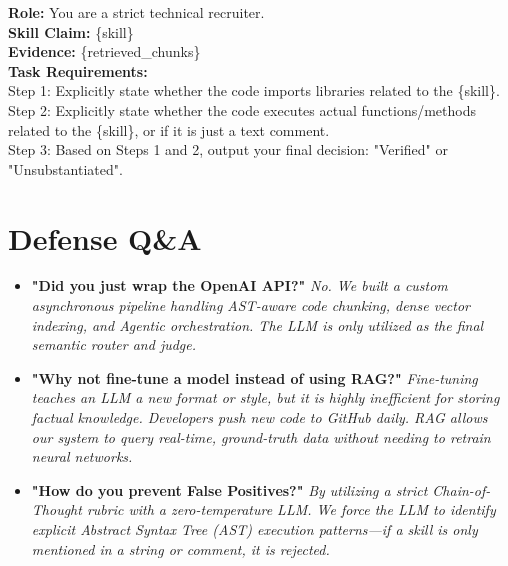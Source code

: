 \documentclass[12pt,a4paper]{article}
\begin{document}
\begin{tcolorbox}[colback=blue!5!white,colframe=blue!75!black,title=The System Prompt (Chain-of-Thought)]
\textbf{Role:} You are a strict technical recruiter. \\
\textbf{Skill Claim:} \{skill\} \\
\textbf{Evidence:} \{retrieved\_chunks\} \\
\vspace{0.5em}
\textbf{Task Requirements:} \\
Step 1: Explicitly state whether the code imports libraries related to the \{skill\}. \\
Step 2: Explicitly state whether the code executes actual functions/methods related to the \{skill\}, or if it is just a text comment. \\
Step 3: Based on Steps 1 and 2, output your final decision: "Verified" or "Unsubstantiated".
\end{tcolorbox}

\section{Defense Q\&A}
\begin{itemize}
    \item \textbf{"Did you just wrap the OpenAI API?"} \newline \textit{No. We built a custom asynchronous pipeline handling AST-aware code chunking, dense vector indexing, and Agentic orchestration. The LLM is only utilized as the final semantic router and judge.}
    \item \textbf{"Why not fine-tune a model instead of using RAG?"} \newline \textit{Fine-tuning teaches an LLM a new format or style, but it is highly inefficient for storing factual knowledge. Developers push new code to GitHub daily. RAG allows our system to query real-time, ground-truth data without needing to retrain neural networks.}
    \item \textbf{"How do you prevent False Positives?"} \newline \textit{By utilizing a strict Chain-of-Thought rubric with a zero-temperature LLM. We force the LLM to identify explicit Abstract Syntax Tree (AST) execution patterns—if a skill is only mentioned in a string or comment, it is rejected.}
\end{itemize}
\end{document}
